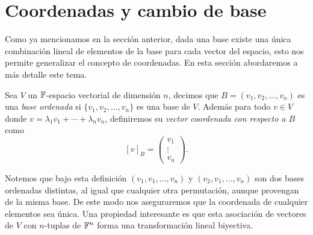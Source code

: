 \section{Coordenadas y cambio de base}

Como ya mencionamos en la sección anterior, dada una base existe una única combinación lineal de elementos de la base para cada vector del espacio, esto nos permite generalizar el concepto de coordenadas. En esta sección abordaremos a más detalle este tema.


\begin{defi}
  Sea $V$ un $\mathbb{F}$-espacio vectorial de dimensión $n$, decimos que $B = (v_1, v_2, \ldots, v_n)$ es una \emph{base ordenada} si $\{v_1, v_2, \ldots, v_n\}$ es una base de $V$. Además para todo $v \in V$ donde $v = \lambda_1 v_1 + \cdots + \lambda_n v_n$, definiremos su \emph{vector coordenada con respecto a $B$} como
    \[ [v]_B = \begin{pmatrix}
      v_1 \\ \vdots \\ v_n
    \end{pmatrix}.\]
\end{defi}

Notemos que bajo esta definición $(v_1, v_1, \ldots, v_n)$ y $(v_2, v_1, \ldots, v_n)$ son dos bases ordenadas distintas, al igual que cualquier otra permutación, aunque provengan de la misma base. De este modo nos aseguraremos que la coordenada de cualquier elementos sea única. Una propiedad interesante es que esta asociación de vectores de $V$ con $n$-tuplas de $\mathbb{F}^n$ forma una transformación lineal biyectiva.

